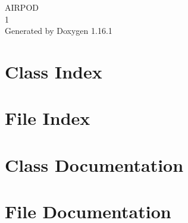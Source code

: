 \documentclass[twoside]{book}
\newcommand{\+}{\discretionary{\mbox{\scriptsize$\hookleftarrow$}}{}{}}
\newcommand{\clearemptydoublepage}{%
    \newpage{\pagestyle{empty}\cleardoublepage}%
  }
\begin{document}
  \raggedbottom
    \hypersetup{pageanchor=false,
                bookmarksnumbered=true,
                pdfencoding=unicode
               }
  \begin{titlepage}
  \vspace*{7cm}
  \begin{center}%
  {\Large AIRPOD}\\
  [1ex]\large 1 \\
  \vspace*{1cm}
  {\large Generated by Doxygen 1.16.1}\\
  \end{center}
  \end{titlepage}
  \clearemptydoublepage
  \tableofcontents
  \clearemptydoublepage
  \hypersetup{pageanchor=true}

\chapter{Class Index}

\chapter{File Index}

\chapter{Class Documentation}




\chapter{File Documentation}




  \backmatter
  \newpage
  \clearemptydoublepage
  \printindex
\end{document}

